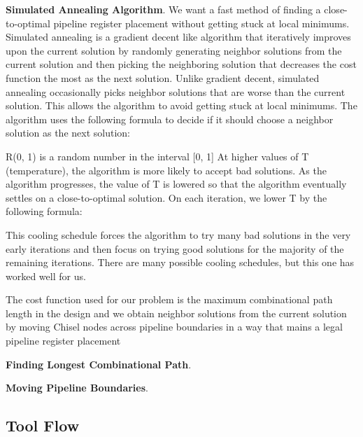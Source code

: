 {\bf Simulated Annealing Algorithm}.
We want a fast method of finding a close-to-optimal pipeline register placement without getting stuck at local minimums. Simulated annealing is a gradient decent like algorithm that iteratively improves upon the current solution by randomly generating neighbor solutions from the current solution and then picking the neighboring solution that decreases the cost function the most as the next solution. Unlike gradient decent, simulated annealing occasionally picks neighbor solutions that are worse than the current solution. This allows the algorithm to avoid getting stuck at local minimums. The algorithm uses the following formula to decide if it should choose a neighbor solution as the next solution:

R(0, 1) is a random number in the interval [0, 1]
At higher values of T (temperature), the algorithm is more likely to accept bad solutions. As the algorithm progresses, the value of T is lowered so that the algorithm eventually settles on a close-to-optimal solution. On each iteration, we lower T by the following formula:

This cooling schedule forces the algorithm to try many bad solutions in the very early iterations and then focus on trying good solutions for the majority of the remaining iterations. There are many possible cooling schedules, but this one has worked well for us.

The cost function used for our problem is the maximum combinational path length in the design and we obtain neighbor solutions from the current solution by moving Chisel nodes across pipeline boundaries in a way that mains a legal pipeline register placement

{\bf Finding Longest Combinational Path}.

{\bf Moving Pipeline Boundaries}.

\subsection{Tool Flow}


